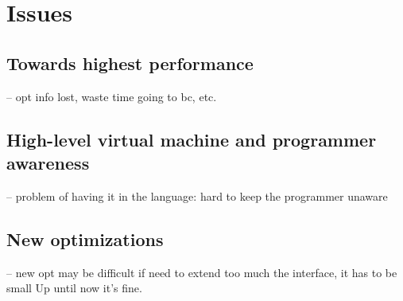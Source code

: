\documentclass[a4paper,12pt,twoside]{../includes/ThesisStyle}
\begin{document}
\section{Issues}

\subsection{Towards highest performance}
-- opt info lost, waste time going to bc, etc.

\subsection{High-level virtual machine and programmer awareness}
-- problem of having it in the language: hard to keep the programmer unaware

\subsection{New optimizations}
-- new opt may be difficult if need to extend too much the interface, it has to be small
Up until now it's fine.

\ifx\wholebook\relax\else
    
\end{document}
